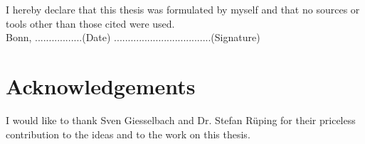 \documentclass[12pt,a4paper] {report}
\begin{document}
  \sloppy


\clearpage

\vspace*{\fill}
I hereby declare that this thesis was formulated by myself and that no sources or tools other than those cited were used.
\\
Bonn, .................(Date) ...................................(Signature)
\clearpage

\chapter*{Acknowledgements}
I would like to thank Sven Giesselbach and Dr. Stefan R\"uping for their priceless contribution to  
the ideas and to the work on this thesis.   
\clearpage



\clearpage

\tableofcontents

\clearpage










\clearpage

\listoffigures
\clearpage
 
\listoftables
\clearpage

\renewcommand{\bibname}{References}


\end{document}
